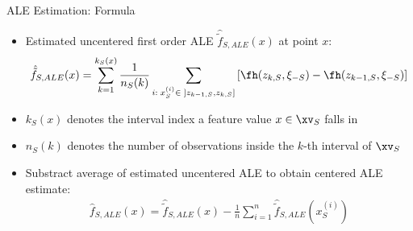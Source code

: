 \documentclass[11pt,compress,t,notes=noshow, aspectratio=169, xcolor=table]{beamer}
\begin{document}
%
%
%
%
%
%
%
%
%
%
%
%
%
%

\begin{frame}{ALE Estimation: Formula}

\begin{itemize}
\item Estimated uncentered first order ALE $\hat{\tilde{f}}_{S, ALE}(x)$ at point $x$:
$$
\begin{aligned}
\hat{\tilde{f}}_{S, ALE}(x) = \sum_{k = 1}^{k_S(x)}\frac{1}{n_S(k)}\sum_{i: \; x_S^{(i)} \in \; ]z_{k-1, S}, z_{k, S}]}\left[\fh(z_{k, S}, \xi_{-S}) -\fh(z_{k-1, S}, \xi_{-S})\right]
\end{aligned}
$$
\item $k_S(x)$ denotes the interval index a feature value $x \in \xv_S$ falls in
\item $n_S(k)$ denotes the number of observations inside the $k$-th interval of $\xv_S$
\item Substract average of estimated uncentered ALE to obtain centered ALE estimate: %
$$
\begin{aligned}
\hat{f}_{S, ALE}(x) = \hat{\tilde{f}}_{S, ALE}(x) - \frac{1}{n}\sum_{i = 1}^n \hat{\tilde{f}}_{S, ALE}(x_S^{(i)})
\end{aligned}
$$

\end{itemize}
\end{frame}
\end{document}
